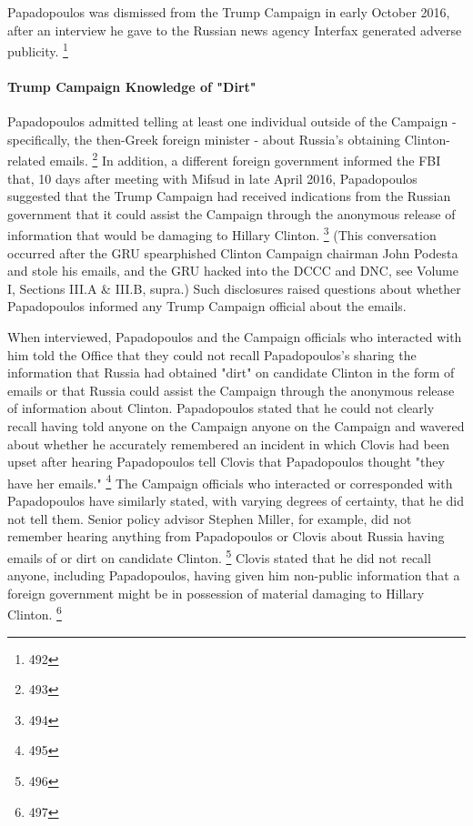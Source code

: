 Papadopoulos was dismissed from the Trump Campaign in early October 2016, after an interview he gave to the Russian news agency Interfax generated adverse publicity.%
\footnote{492}

\paragraph{Trump Campaign Knowledge of "Dirt"}

Papadopoulos admitted telling at least one individual outside of the Campaign - specifically, the then-Greek foreign minister - about Russia's obtaining Clinton-related emails.%
\footnote{493}
In addition, a different foreign government informed the FBI that, 10 days after meeting with Mifsud in late April 2016, Papadopoulos suggested that the Trump Campaign had received indications from the Russian government that it could assist the Campaign through the anonymous release of information that would be damaging to Hillary Clinton.%
\footnote{494}
(This conversation occurred after the GRU spearphished Clinton Campaign chairman John Podesta and stole his emails, and the GRU hacked into the DCCC and DNC, see Volume I, Sections III.A \& III.B, supra.)
Such disclosures raised questions about whether Papadopoulos informed any Trump Campaign official about the emails.

When interviewed, Papadopoulos and the Campaign officials who interacted with him told the Office that they could not recall Papadopoulos's sharing the information that Russia had obtained "dirt" on candidate Clinton in the form of emails or that Russia could assist the Campaign through the anonymous release of information about Clinton.
Papadopoulos stated that he could not clearly recall having told anyone on the Campaign anyone on the Campaign and wavered about whether he accurately remembered an incident in which Clovis had been upset after hearing Papadopoulos tell Clovis that Papadopoulos thought "they have her emails."%
\footnote{495}
The Campaign officials who interacted or corresponded with Papadopoulos have similarly stated, with varying degrees of certainty, that he did not tell them.
Senior policy advisor Stephen Miller, for example, did not remember hearing anything from Papadopoulos or Clovis about Russia having emails of or dirt on candidate Clinton.%
\footnote{496}
Clovis stated that he did not recall anyone, including Papadopoulos, having given him non-public information that a foreign government might be in possession of material damaging to Hillary Clinton.%
\footnote{497}

